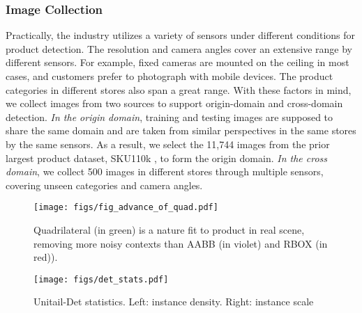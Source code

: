 \documentclass[runningheads]{llncs}
\begin{document}
\subsubsection{Image Collection} 
Practically, the industry utilizes a variety of sensors under different conditions for product detection. The resolution and camera angles cover an extensive range by different sensors.
For example, fixed cameras are mounted on the ceiling in most cases, and customers prefer to photograph with mobile devices. The product categories in different stores also span a great range.
With these factors in mind, we collect images from two sources to support origin-domain and cross-domain detection. 
\textit{In the origin domain}, training and testing images are supposed to share the same domain and are taken from similar perspectives in the same stores by the same sensors. As a result, we select the 11,744 images from the prior largest product dataset, SKU110k \cite{SKU110k}, to form the origin domain. 
\textit{In the cross domain}, we collect 500 images in different stores through multiple sensors, covering unseen categories and camera angles.

\begin{figure}[t]
    \begin{minipage}{.48\columnwidth}
    \centering
    \texttt{[image: figs/fig\_advance\_of\_quad.pdf]}
    \caption{Quadrilateral (in green) is a nature fit to product in real scene, removing more noisy contexts than AABB (in violet) and RBOX (in red)).}
    \label{fig:advance_of_quad}
    \end{minipage}%
    \hfill
    \begin{minipage}{.47\columnwidth}
    \centering
    \texttt{[image: figs/det\_stats.pdf]}
    \caption{Unitail-Det statistics. Left: instance density. Right: instance scale}
    \label{fig:det_stats}
    \end{minipage}
\end{figure}
\end{document}
